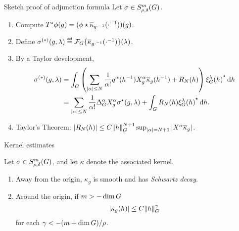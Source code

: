 \documentclass[handout]{beamer}
\begin{document}
\begin{frame}{Sketch proof of adjunction formula}
    Let $\sigma \in \SymbolClass m {\rho, \delta}$.
    \begin{enumerate}
        \item Compute $\adj T \phi(g) = (\conv \phi {\conj \kappa_{g \dummy^{-1}}}(\dummy^{-1}))(g)$.
        \item Define $\sigma^{(*)}(g, \lambda) \defeq \Fourier \{ \conj \kappa_{g \dummy^{-1}}(\dummy^{-1}) \}(\lambda)$.
        \item By a Taylor development,
            \begin{align*}
                \sigma^{(*)}(g, \lambda)
                &= \int_\Group \left(\sum_{\abs \alpha \leq N} \frac 1 {\alpha !} q^\alpha(h^{-1}) \LeftDifferentialOperator [g] \alpha \conj \kappa_g(h^{-1}) + R_N(h)\right) \adj {\Rep \lambda(h)} \dd h\\
                &= \sum_{\abs \alpha \leq N} \frac 1 {\alpha !} \DifferenceOperatorOrder \alpha \LeftDifferentialOperator [g] \alpha \adj \sigma(g, \lambda) + \int_\Group R_N(h) \adj {\Rep \lambda(h)} \dd h.
            \end{align*}
        \item
            Taylor's Theorem: $\abs {R_N(h)} \leq C \norm [\Group] h^{N + 1} \sup_{\abs \alpha = N + 1} \abs {\LeftDifferentialOperator \alpha \conj \kappa_g}$.
    \end{enumerate}
\end{frame}

\begin{frame}{Kernel estimates}
    \begin{theorem}
        Let $\sigma \in \SymbolClass m {\rho, \delta}$,
        and let $\kappa$ denote the associated kernel.

        \begin{enumerate}
            \item
                Away from the origin,
                $\kappa_g$ is smooth and has \emph{Schwartz decay}.
            \item
                Around the origin,
                if $m > -\dim \Group$
                \begin{align*}
                    \abs {\kappa_g(h)} \leq C \norm [\Group] h^{\gamma}
                \end{align*}
                for each $\gamma < -(m + \dim \Group) / \rho$.
        \end{enumerate}
    \end{theorem}
\end{frame}
\end{document}
